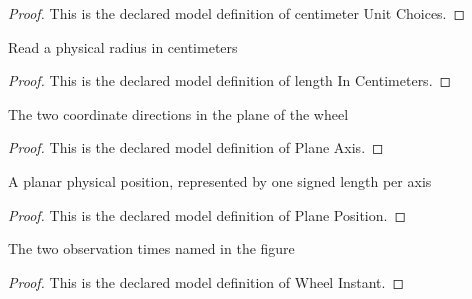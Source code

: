 \begin{proof}
  This is the declared model definition of centimeter Unit Choices.
\end{proof}
\begin{definition}
  \label{def:physics:phyx-mini-0736:phyxminiproblems-problemphyxmini0736-lengthincentimeters}
  Read a physical radius in centimeters
\end{definition}
\begin{proof}
  This is the declared model definition of length In Centimeters.
\end{proof}
\begin{definition}
  \label{def:physics:phyx-mini-0736:phyxminiproblems-problemphyxmini0736-planeaxis}
  The two coordinate directions in the plane of the wheel
\end{definition}
\begin{proof}
  This is the declared model definition of Plane Axis.
\end{proof}
\begin{definition}
  \label{def:physics:phyx-mini-0736:phyxminiproblems-problemphyxmini0736-planeposition}
  A planar physical position, represented by one signed length per axis
\end{definition}
\begin{proof}
  This is the declared model definition of Plane Position.
\end{proof}
\begin{definition}
  \label{def:physics:phyx-mini-0736:phyxminiproblems-problemphyxmini0736-wheelinstant}
  The two observation times named in the figure
\end{definition}
\begin{proof}
  This is the declared model definition of Wheel Instant.
\end{proof}
